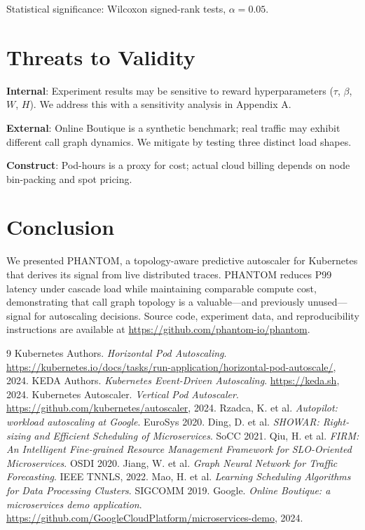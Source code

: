 \documentclass[sigconf,nonacm]{acmart}
\begin{document}
Statistical significance: Wilcoxon signed-rank tests, $\alpha=0.05$.

\section{Threats to Validity}

\textbf{Internal}: Experiment results may be sensitive to reward hyperparameters ($\tau$, $\beta$, $W$, $H$). We address this with a sensitivity analysis in Appendix A.

\textbf{External}: Online Boutique is a synthetic benchmark; real traffic may exhibit different call graph dynamics. We mitigate by testing three distinct load shapes.

\textbf{Construct}: Pod-hours is a proxy for cost; actual cloud billing depends on node bin-packing and spot pricing.

\section{Conclusion}
We presented PHANTOM, a topology-aware predictive autoscaler for Kubernetes that derives its signal from live distributed traces.
PHANTOM reduces P99 latency under cascade load while maintaining comparable compute cost, demonstrating that call graph topology is a valuable---and previously unused---signal for autoscaling decisions.
Source code, experiment data, and reproducibility instructions are available at \url{https://github.com/phantom-io/phantom}.

\begin{thebibliography}{9}
 Kubernetes Authors. \textit{Horizontal Pod Autoscaling}. \url{https://kubernetes.io/docs/tasks/run-application/horizontal-pod-autoscale/}, 2024.
 KEDA Authors. \textit{Kubernetes Event-Driven Autoscaling}. \url{https://keda.sh}, 2024.
 Kubernetes Autoscaler. \textit{Vertical Pod Autoscaler}. \url{https://github.com/kubernetes/autoscaler}, 2024.
 Rzadca, K. et al. \textit{Autopilot: workload autoscaling at Google}. EuroSys 2020.
 Ding, D. et al. \textit{SHOWAR: Right-sizing and Efficient Scheduling of Microservices}. SoCC 2021.
 Qiu, H. et al. \textit{FIRM: An Intelligent Fine-grained Resource Management Framework for SLO-Oriented Microservices}. OSDI 2020.
 Jiang, W. et al. \textit{Graph Neural Network for Traffic Forecasting}. IEEE TNNLS, 2022.
 Mao, H. et al. \textit{Learning Scheduling Algorithms for Data Processing Clusters}. SIGCOMM 2019.
 Google. \textit{Online Boutique: a microservices demo application}. \url{https://github.com/GoogleCloudPlatform/microservices-demo}, 2024.
\end{thebibliography}
\end{document}
